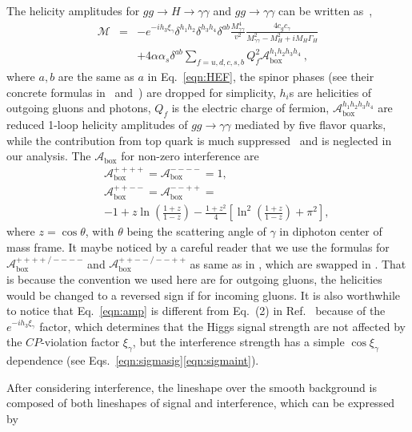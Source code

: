 \documentclass[twocolumn,
prd,amssymb,amsmath,preprintnumbers,
floatfix,aps,nofootinbib]{revtex4-1}
\newcommand{\bea}{\begin{eqnarray}}
\newcommand{\eea}{\end{eqnarray}}
\begin{document}
The helicity amplitudes for $gg\to H\to\gamma\gamma$ and  $gg\to \gamma\gamma$
can be written as~\cite{Martin:2012xc,Bern:2001df,Bern:2002jx},
\bea
\mathcal{M}
&=& -e^{-i h_3\xi_\gamma}\delta^{h_1h_2}\delta^{h_3h_4}\delta^{a b}\frac{M^4_{\gamma\gamma}}{v^2}
\frac{4c_gc_\gamma}{M^2_{\gamma\gamma}-M^2_H+iM_H\Gamma_H}  \nonumber \\
&& + 4\alpha\alpha_s\delta^{a b}\sum_{f=u,d,c,s,b} Q^2_f
\mathcal{A}_{\text{box}}^{h_1 h_2 h_3h_4}~,
\label{eqn:amp}
\eea
where $a,b$ are the same as $a$ in Eq.~\eqref{eqn:HEF},
the spinor phases (see their concrete formulas in~\cite{Bern:2001df,Bern:2002jx} and~\cite{Chen:2017plj}) are dropped for simplicity,
 $h_i$s are helicities of outgoing gluons and photons,
$Q_f$ is the electric charge of fermion,
$\mathcal{A}_{\text{box}}^{h_1 h_2 h_3h_4}$ are reduced 1-loop helicity amplitudes of
$gg\to \gamma\gamma$ mediated by
 five flavor quarks, while the contribution from top quark is
much suppressed~\cite{Dicus:1987fk} and is neglected in our analysis.
The $\mathcal{A}_{\text{box}}$ for non-zero interference are~\cite{Martin:2012xc,Bern:2001df,Bern:2002jx}
\bea
&&\mathcal{A}_{\text{box}}^{++++}=\mathcal{A}_{\text{box}}^{----}=1, \nonumber \\
&&\mathcal{A}_{\text{box}}^{++--}=\mathcal{A}_{\text{box}}^{--++}=  \nonumber \\
&&-1 + z \ln\left (\frac{1 + z}{1 - z}\right) - \frac{1 + z^2}{4}\left[\ln^2
\left(\frac{1 + z}{1 - z}\right)+\pi^2\right],
\label{eqn:appmm}
\eea
where $z=\cos\theta$, with $\theta$ being the scattering angle of $\gamma$ in
diphoton center of mass frame. It maybe noticed by a careful reader that we use
the formulas for $\mathcal{A}_{\text{box}}^{++++/----}$ and $\mathcal{A}_{\text{box}}^{++--/--++}$ as same as in \cite{Bern:2001df,Bern:2002jx}, which are swapped in \cite{Martin:2012xc}. That is because the convention we used here are for outgoing gluons, the
helicities would be changed to a reversed sign if for incoming gluons.
It is also worthwhile to notice that Eq.~\eqref{eqn:amp} is different from Eq.~(2) in Ref.~\cite{Martin:2012xc} because of the $e^{-i h_3\xi_\gamma}$ factor, which determines that the Higgs signal strength are not affected by the $CP$-violation factor $\xi_\gamma$, but
the interference strength has a simple $\cos\xi_\gamma$ dependence (see Eqs.~\eqref{eqn:sigmasig}\eqref{eqn:sigmaint}).

After considering interference, the lineshape over the smooth background is composed
of both lineshapes of signal and interference, which can be expressed by
\end{document}

